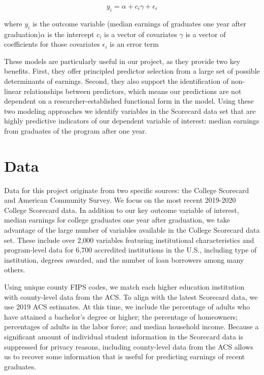 \documentclass[a4paper, 12pt]{article}
\begin{document}
\[y_i = \alpha + c_i\gamma + \epsilon_i\]

\pagebreak

\noindent where \newline $y_i$ is the outcome variable (median
earnings of graduates one year after graduation)\newline $\alpha$ is
the intercept \newline $c_i$ is a vector of covariates \newline
$\gamma$ is a vector of coefficients for those covariates \newline
$\epsilon_i$ is an error term

These models are particularly useful in our project, as they provide
two key benefits. First, they offer principled predictor selection
from a large set of possible determinants of earnings. Second, they
also support the identification of non-linear relationships between
predictors, which means our predictions are not dependent on a
researcher-established functional form in the model. Using these two
modeling approaches we identify variables in the Scorecard data set
that are highly predictive indicators of our dependent variable of
interest: median earnings from graduates of the program after one
year.


\section*{Data}

Data for this project originate from two specific sources: the College
Scorecard and American Community Survey. We focus on the most recent
2019-2020 College Scorecard data. In addition to our key outcome
variable of interest, median earnings for college graduates one year
after graduation, we take advantage of the large number of variables
available in the College Scorecard data set. These include over 2,000
variables featuring institutional characteristics and program-level
data for 6,700 accredited institutions in the U.S., including type of
institution, degrees awarded, and the number of loan borrowers among
many others.

Using unique county FIPS codes, we match each higher education
institution with county-level data from the ACS. To align with the
latest Scorecard data, we use 2019 ACS estimates. At this time, we
include the percentage of adults who have attained a bachelor's degree
or higher; the percentage of homeowners; percentages of adults in the
labor force; and median household income. Because a significant amount
of individual student information in the Scorecard data is suppressed
for privacy reasons, including county-level data from the ACS allows
us to recover some information that is useful for predicting earnings
of recent graduates.
\end{document}
